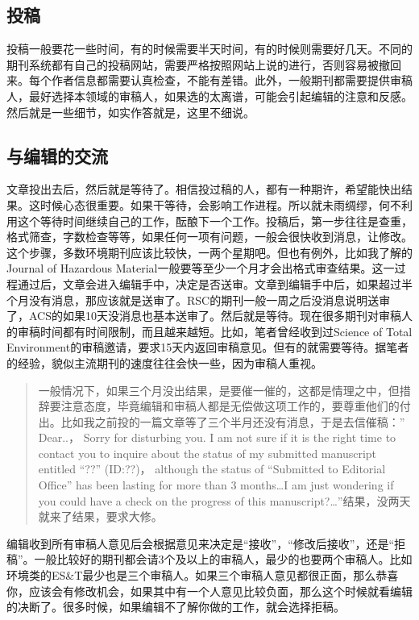 \documentclass[]{book}
\begin{document}
\hypertarget{ux6295ux7a3f}{%
\subsection{投稿}\label{ux6295ux7a3f}}

投稿一般要花一些时间，有的时候需要半天时间，有的时候则需要好几天。不同的期刊系统都有自己的投稿网站，需要严格按照网站上说的进行，否则容易被撤回来。每个作者信息都需要认真检查，不能有差错。此外，一般期刊都需要提供审稿人，最好选择本领域的审稿人，如果选的太离谱，可能会引起编辑的注意和反感。然后就是一些细节，如实作答就是，这里不细说。

\hypertarget{ux4e0eux7f16ux8f91ux7684ux4ea4ux6d41}{%
\subsection{与编辑的交流}\label{ux4e0eux7f16ux8f91ux7684ux4ea4ux6d41}}

文章投出去后，然后就是等待了。相信投过稿的人，都有一种期许，希望能快出结果。这时候心态很重要。如果干等待，会影响工作进程。所以就未雨绸缪，何不利用这个等待时间继续自己的工作，酝酿下一个工作。投稿后，第一步往往是查重，格式筛查，字数检查等等，如果任何一项有问题，一般会很快收到消息，让修改。这个步骤，多数环境期刊应该比较快，一两个星期吧。但也有例外，比如我了解的Journal of Hazardous Material一般要等至少一个月才会出格式审查结果。这一过程通过后，文章会进入编辑手中，决定是否送审。文章到编辑手中后，如果超过半个月没有消息，那应该就是送审了。RSC的期刊一般一周之后没消息说明送审了，ACS的如果10天没消息也基本送审了。然后就是等待。现在很多期刊对审稿人的审稿时间都有时间限制，而且越来越短。比如，笔者曾经收到过Science of Total Environment的审稿邀请，要求15天内返回审稿意见。但有的就需要等待。据笔者的经验，貌似主流期刊的速度往往会快一些，因为审稿人重视。

\begin{quote}
一般情况下，如果三个月没出结果，是要催一催的，这都是情理之中，但措辞要注意态度，毕竟编辑和审稿人都是无偿做这项工作的，要尊重他们的付出。比如我之前投的一篇文章等了三个半月还没有消息，于是去信催稿：'' Dear..， Sorry for disturbing you. I am not sure if it is the right time to contact you to inquire about the status of my submitted manuscript entitled ``??'' (ID:??)， although the status of ``Submitted to Editorial Office'' has been lasting for more than 3 months\ldots{}I am just wondering if you could have a check on the progress of this manuscript?\ldots{}''结果，没两天就来了结果，要求大修。
\end{quote}

编辑收到所有审稿人意见后会根据意见来决定是``接收''，``修改后接收''，还是``拒稿''。一般比较好的期刊都会请3个及以上的审稿人，最少的也要两个审稿人。比如环境类的ES\&T最少也是三个审稿人。如果三个审稿人意见都很正面，那么恭喜你，应该会有修改机会，如果其中有一个人意见比较负面，那么这个时候就看编辑的决断了。很多时候，如果编辑不了解你做的工作，就会选择拒稿。
\end{document}
